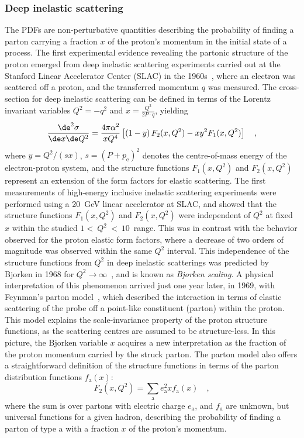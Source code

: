 \subsubsection{Deep inelastic scattering}
The PDFs are non-perturbative quantities describing the probability of finding a parton carrying a fraction $x$ of the proton's momentum in the initial state of a process. The first experimental evidence revealing the partonic structure of the proton emerged from deep inelastic scattering experiments carried out at the Stanford Linear Accelerator Center (SLAC) in the 1960s~\cite{Friedman:1972sy}, where an electron was scattered off a proton, and the transferred momentum $q$ was measured. The cross-section for deep inelastic scattering can be defined in terms of the Lorentz invariant variables $Q^2 = -q^2$ and $x = \frac{Q^2}{2P\cdot q}$, yielding
\begin{equation*}
    \frac{\de^2\sigma}{\de x \de Q^2} = \frac{4\pi\alpha^2}{xQ^4} \left[ \left(1-y\right)F_2(x,Q^2) - xy^2F_1(x,Q^2) \right]\quad ,
\end{equation*}
where $y=Q^2/(sx)$, $s = (P+p_\mathrm{e})^2$ denotes the centre-of-mass energy of the electron-proton system, and the structure functions $F_1(x,Q^2)$ and $F_2(x,Q^2)$ represent an extension of the form factors for elastic scattering.
The first measurements of high-energy inclusive inelastic scattering experiments were performed using a 20~GeV linear accelerator at SLAC, and showed that the structure functions $F_1(x,Q^2)$ and $F_2(x,Q^2)$ were independent of $Q^2$ at fixed $x$ within the studied $1<~Q^2~<~10$~\gevcc range. This was in contrast with the behavior observed for the proton elastic form factors, where a decrease of two orders of magnitude was observed within the same $Q^2$ interval. This independence of the structure functions from $Q^2$ in deep inelastic scatterings was predicted by Bjorken in 1968 for $Q^2 \rightarrow \infty$~\cite{Bjorken:1968dy}, and is known as \emph{Bjorken scaling}. A physical interpretation of this phenomenon arrived just one year later, in 1969, with Feynman's parton model~\cite{Feynman:1969ej}, which described the interaction in terms of elastic scattering of the probe off a point-like constituent (parton) within the proton. This model explains the scale-invariance property of the proton structure functions, as the scattering centres are assumed to be structure-less. In this picture, the Bjorken variable $x$ acquires a new interpretation as the fraction of the proton momentum carried by the struck parton. The parton model also offers a straightforward definition of the structure functions in terms of the parton distribution functions $f_\mathrm{a}(x)$:
\begin{equation*}
    F_2(x,Q^2) = \sum_\mathrm{a} e_\mathrm{a}^2 x f_\mathrm{a}(x)\quad ,
\end{equation*}
where the sum is over partons with electric charge $e_\mathrm{a}$, and $f_\mathrm{a}$ are unknown, but universal functions for a given hadron, describing the probability of finding a parton of type a with a fraction $x$ of the proton's momentum. 

